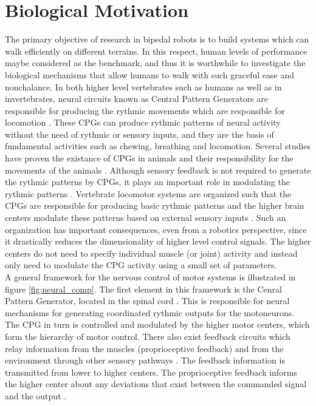 \documentclass[12pt,twoside]{article}
\theoremstyle{plain}
\theoremstyle{definition}
\theoremstyle{remark}
\newcommand{\forceindent}{\leavevmode{\parindent=2em\indent}}
\begin{document}
\section{Biological Motivation}
\label{sec:Biological_Motivation}
\forceindent The primary objective of research in bipedal robots is to build systems which can walk efficiently on different terrains. In this respect, human levels of performance maybe considered as the benchmark, and thus it is worthwhile to investigate the biological mechanisms that allow humans to walk with such graceful ease and nonchalance. In both higher level vertebrates such as humans as well as in invertebrates, neural circuits known as Central Pattern Generators are responsible for producing the rythmic movements which are responsible for locomotion \cite{Ijspeert2008}. These CPGs can produce rythmic patterns of neural activity without the need of rythmic or sensory inputs, and they are the basis of fundamental activities such as chewing, breathing and locomotion. Several studies have proven the existance of CPGs in animals and their responsibility for the movements of the animals \cite{cohen1980neuronal,grillner1985neural,stein1999neurons}. Although sensory feedback is not required to generate the rythmic patterns by CPGs, it plays an important role in modulating the rythmic patterns \cite{Ijspeert2008}. Vertebrate locomotor systems are organized such that the CPGs are responsible for producing basic rythmic patterns and the higher brain centers modulate these patterns based on external sensory inputs \cite{Ijspeert2008}. Such an organization has important consequences, even from a robotics perspective, since it drastically reduces the dimensionality of higher level control signals. The higher centers do not need to specify individual muscle (or joint) activity and instead only need to modulate the CPG activity using a small set of parameters.\\
\forceindent A general framework for the nervous control of motor systems is illustrated in figure \ref{fig:neural_comp}. The first element in this framework is the Cenral Pattern Generator, located in the spinal cord \cite{neurobiology1994shepherd}. This is responsible for neural mechanisms for generating coordinated rythmic outputs for the motoneurons. The CPG in turn is controlled and modulated by the higher motor centers, which form the hierarchy of motor control. There also exist feedback circuits which relay information from the muscles (proprioceptive feedback) and from the environment through other sensory pathways \cite{neurobiology1994shepherd}. The feedback information is transmitted from lower to higher centers. The proprioceptive feedback informs the higher center about any deviations that exist between the commanded signal and the output \cite{neurobiology1994shepherd}.
\end{document}
